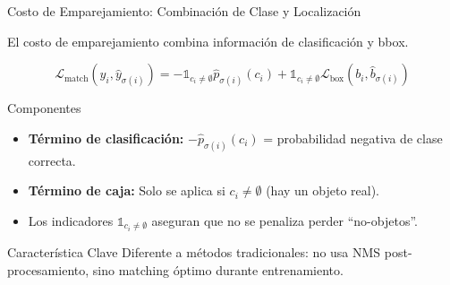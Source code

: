 \documentclass[aspectratio=169, 10pt]{beamer}
\begin{document}
\begin{frame}[shrink]{Costo de Emparejamiento: Combinaci\'on de Clase y Localizaci\'on}

	El costo de emparejamiento combina informaci\'on de clasificaci\'on y bbox.

	\vspace{0.2cm}

	{\small
	\[
	\mathcal{L}_{\text{match}}(y_i, \hat{y}_{\sigma(i)}) = -\mathbb{1}_{c_i \neq \emptyset} \hat{p}_{\sigma(i)}(c_i) + \mathbb{1}_{c_i \neq \emptyset} \mathcal{L}_{\text{box}}(b_i, \hat{b}_{\sigma(i)})
	\]
	}

	\vspace{0.2cm}

	\begin{block}{Componentes}
		\begin{itemize}
			\item \textbf{T\'ermino de clasificaci\'on:} $-\hat{p}_{\sigma(i)}(c_i)$ = probabilidad negativa de clase correcta.
			\item \textbf{T\'ermino de caja:} Solo se aplica si $c_i \neq \emptyset$ (hay un objeto real).
			\item Los indicadores $\mathbb{1}_{c_i \neq \emptyset}$ aseguran que no se penaliza perder ``no-objetos''.
		\end{itemize}
	\end{block}

	\vspace{0.2cm}

	\begin{alertblock}{Caracter\'istica Clave}
		Diferente a m\'etodos tradicionales: no usa NMS post-procesamiento, sino matching \'optimo durante entrenamiento.
	\end{alertblock}

\end{frame}
\end{document}
